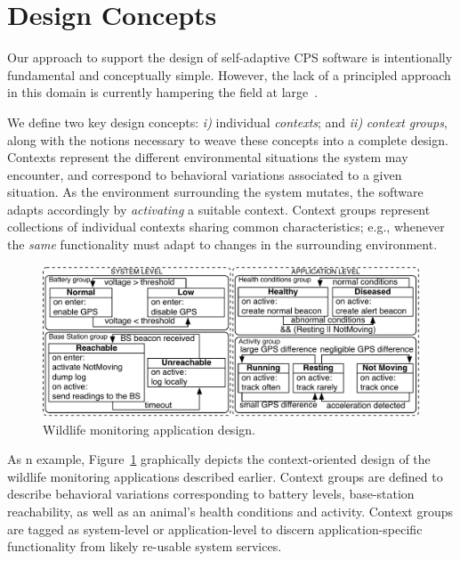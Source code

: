 \section{Design Concepts}
\label{sec:design}

Our approach to support the design of self-adaptive CPS software is
intentionally fundamental and conceptually simple. However, the lack
of a principled approach in this domain is currently hampering the
field at large~\cite{Picco:2010:SEW:1882362.1882421}. %

We define two key design concepts: \emph{i)} individual
\emph{contexts}; and \emph{ii)} \emph{context groups}, along with the
notions necessary to weave these concepts into a complete design.
Contexts represent the different environmental situations the system
may encounter, and correspond to behavioral variations associated to a
given situation. As the environment surrounding the system mutates,
the software adapts accordingly by \emph{activating} a suitable
context. Context groups represent collections of individual contexts
sharing common characteristics; e.g., whenever the \emph{same}
functionality must adapt to changes in the surrounding environment.

\begin{figure}
\begin{center}
\includegraphics[scale=.45]{imgs/wildlifetracking}
\vspace{-4mm}
\caption{Wildlife monitoring application design.}
  \label{fig:design}
\vspace{-6mm}
\end{center}
\end{figure}

As n example, Figure~\ref{fig:design} graphically depicts the
context-oriented design of the wildlife monitoring applications
described earlier. Context groups are defined to describe behavioral
variations corresponding to battery levels, base-station reachability,
as well as an animal's health conditions and activity. Context groups
are tagged as system-level or application-level to discern
application-specific functionality from likely re-usable system
services.

